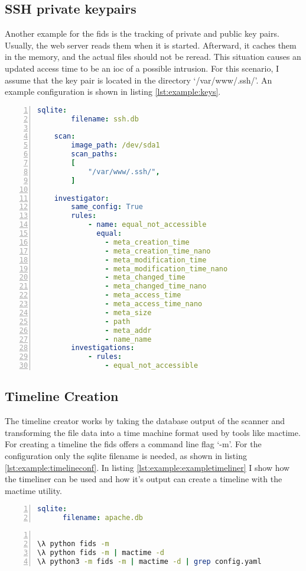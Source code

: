 \subsection{SSH private keypairs}

Another example for the \gls{fids} is the tracking of private and public key pairs. Usually, the web server reads them when it is started. Afterward, it caches them in the memory, and the actual files should not be reread. This situation causes an updated access time to be an \gls{ioc} of a possible \gls{intrusion}. For this scenario, I assume that the key pair is located in the directory `/var/www/.ssh/'. An example configuration is shown in listing \ref{lst:example:keys}.

\begin{lstlisting}[language=yaml, numbers=left, caption=Example SSH Keypair Configuration, label=lst:example:keys]
    sqlite:
        filename: ssh.db
        
    scan:
        image_path: /dev/sda1
        scan_paths: 
        [
            "/var/www/.ssh/",
        ]

    investigator:
        same_config: True
        rules: 
            - name: equal_not_accessible
              equal:
                - meta_creation_time
                - meta_creation_time_nano
                - meta_modification_time
                - meta_modification_time_nano
                - meta_changed_time
                - meta_changed_time_nano
                - meta_access_time
                - meta_access_time_nano
                - meta_size
                - path
                - meta_addr
                - name_name
        investigations:
            - rules:
                - equal_not_accessible

\end{lstlisting}

\subsection{Timeline Creation}

The timeline creator works by taking the database output of the scanner and transforming the file data into a time machine format used by tools like mactime. For creating a timeline the \gls{fids} offers a command line flag `-m'. For the configuration only the sqlite filename is needed, as shown in listing \ref{lst:example:timelineconf}. In listing \ref{lst:example:exampletimeliner} I show how the timeliner can be used and how it's output can create a timeline with the mactime utility.

\begin{lstlisting}[language=yaml, numbers=left, caption=Database Config, label=lst:example:timelineconf]
  sqlite:
      filename: apache.db

\end{lstlisting}

\begin{lstlisting}[language=bash, numbers=left, caption=Timeliner Example, label=lst:example:exampletimeliner]

\λ python fids -m
\λ python fids -m | mactime -d
\λ python3 -m fids -m | mactime -d | grep config.yaml
\end{lstlisting}